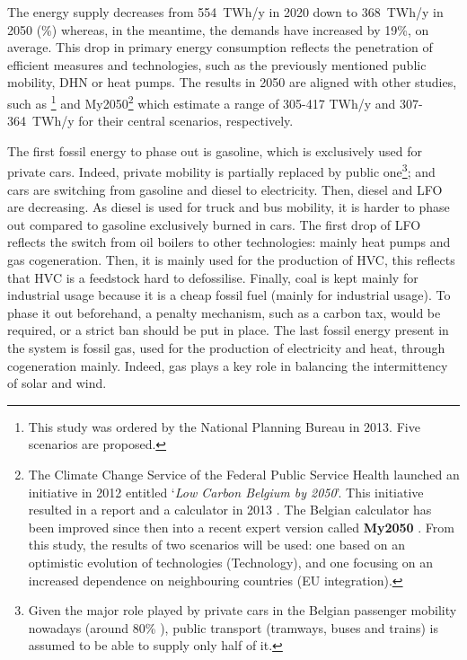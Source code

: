 The energy supply decreases from 554~TWh/y in 2020 down to 368~TWh/y in 2050 (\%) whereas, in the meantime, the demands have increased by 19\%, on average. This drop in primary energy consumption reflects the penetration of efficient measures and technologies, such as the previously mentioned public mobility, \gls{DHN} or heat pumps. The results in 2050 are aligned with other studies, such as \citet{Devogelaer2013}\footnote{This study was ordered by the National Planning Bureau in 2013. Five scenarios are proposed.} and My2050\footnote{The Climate Change Service of the Federal Public Service Health launched an initiative in 2012 entitled `\emph{Low Carbon Belgium by 2050}'. This initiative resulted in a report and a calculator in 2013 \cite{Cornet2013}. The Belgian calculator has been improved since then into a recent expert version called \textbf{My2050} \cite{My2050}. From this study, the results of two scenarios will be used: one based on an optimistic evolution of technologies (Technology), and one focusing on an increased dependence on neighbouring countries (EU integration).} \cite{My2050} which estimate a range of 305-417 TWh/y and 307-364~TWh/y for their central scenarios, respectively.

The first fossil energy to phase out is gasoline, which is exclusively used for private cars. Indeed, private mobility is partially replaced by public one\footnote{Given the major role played by private cars in the Belgian passenger mobility nowadays (\ie around 80\% \cite{BFP_mob}), public transport (\eg tramways, buses and trains) is assumed to be able to supply only half of it.}; and cars are switching from gasoline and diesel to electricity. Then, diesel and \gls{LFO} are decreasing. As diesel is used for truck and bus mobility, it is harder to phase out compared to gasoline exclusively burned in cars. The first drop of \gls{LFO} reflects the switch from oil boilers to other technologies: mainly heat pumps and gas cogeneration. Then, it is mainly used for the production of \gls{HVC}, this reflects that \gls{HVC} is a feedstock hard to defossilise. Finally, coal is kept mainly for industrial usage because it is a cheap fossil fuel (mainly for industrial usage). To phase it out beforehand, a penalty mechanism, such as a carbon tax, would be required, or a strict ban should be put in place. The last fossil energy present in the system is fossil gas, used for the production of electricity and heat, through cogeneration mainly. Indeed, gas plays a key role in balancing the intermittency of solar and wind.

